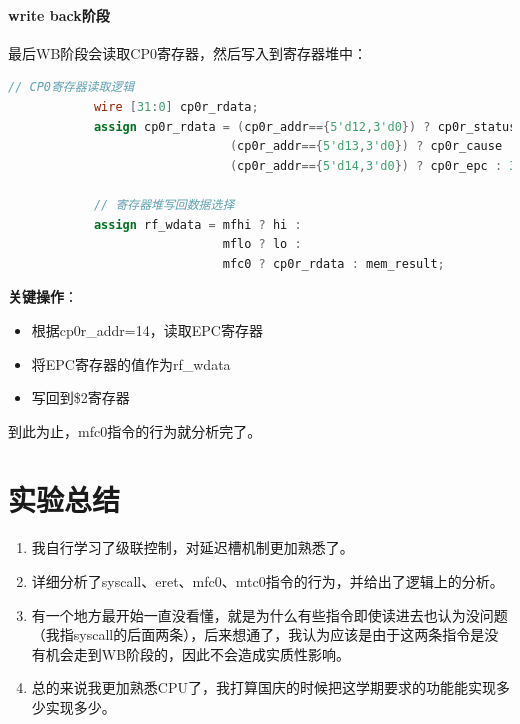 \documentclass[a4paper]{article}
\begin{document}
        \paragraph{write back阶段} 
        最后WB阶段会读取CP0寄存器，然后写入到寄存器堆中：

        \begin{lstlisting}[language=Verilog, caption=WB阶段CP0寄存器读取]
            // CP0寄存器读取逻辑
            wire [31:0] cp0r_rdata;
            assign cp0r_rdata = (cp0r_addr=={5'd12,3'd0}) ? cp0r_status :
                               (cp0r_addr=={5'd13,3'd0}) ? cp0r_cause  :
                               (cp0r_addr=={5'd14,3'd0}) ? cp0r_epc : 32'd0;
            
            // 寄存器堆写回数据选择
            assign rf_wdata = mfhi ? hi :
                              mflo ? lo :
                              mfc0 ? cp0r_rdata : mem_result;
            \end{lstlisting}
            
            \textbf{关键操作}：
            \begin{itemize}
                \item 根据cp0r\_addr=14，读取EPC寄存器
                \item 将EPC寄存器的值作为rf\_wdata
                \item 写回到\$2寄存器
            \end{itemize}


到此为止，mfc0指令的行为就分析完了。

\section{实验总结}

\begin{enumerate}
    \item 我自行学习了级联控制，对延迟槽机制更加熟悉了。
    \item 详细分析了syscall、eret、mfc0、mtc0指令的行为，并给出了逻辑上的分析。
    \item 有一个地方最开始一直没看懂，就是为什么有些指令即使读进去也认为没问题（我指syscall的后面两条），后来想通了，我认为应该是由于这两条指令是没有机会走到WB阶段的，因此不会造成实质性影响。
    \item 总的来说我更加熟悉CPU了，我打算国庆的时候把这学期要求的功能能实现多少实现多少。
\end{enumerate}

\label{LastPage}
\end{document}
